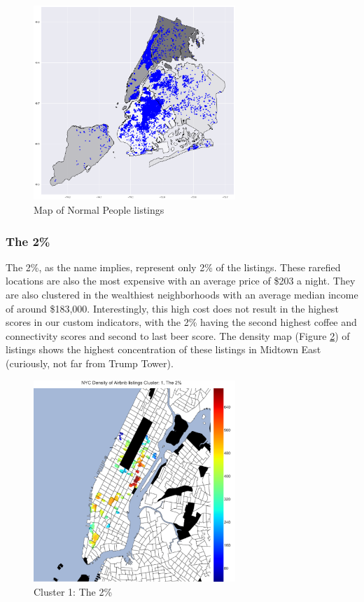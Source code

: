 \documentclass[conference]{IEEEtran}
\begin{document}
\begin{figure}[h]
\centering
\includegraphics[width=3in]{group-1}
\caption{Map of Normal People listings}
\label{normal-map}
\end{figure}

\subsubsection{The 2\%}
The 2\%, as the name implies, represent only 2\% of the listings. These rarefied locations are also the most expensive with an
average price of \$203 a night. They are also clustered in the wealthiest neighborhoods with an average median income of around 
\$183,000. Interestingly, this high cost does not result in the highest scores in our custom indicators, with the 2\% having the
second highest coffee and connectivity scores and second to last beer score. The density map (Figure \ref{Cluster2percent}) of listings shows the highest
concentration of these listings in Midtown East (curiously, not far from Trump Tower).

\begin{figure}[h]
\centering
\includegraphics[width=3in]{Cluster2percent}
\caption{Cluster 1: The 2\%}
\label{Cluster2percent}
\end{figure}
\end{document}
